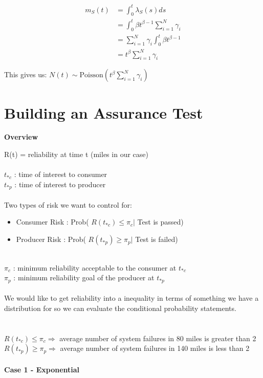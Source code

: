 \documentclass{article}
\begin{document}
$$
\begin{aligned}
	m_S(t) &= \int_0^t \lambda_S(s)ds \\
    &= \int_0^t \beta t^{\beta -1} \sum_{i = 1}^N \gamma_i \\
    &= \sum_{i = 1}^N \gamma_i \int_0^t \beta t^{\beta -1} \\
    &= t^\beta \sum_{i = 1}^N \gamma_i
\end{aligned}
$$

This gives us: $N(t) \sim \text{Poisson}(t^\beta \sum_{i = 1}^N \gamma_i)$


\section{Building an Assurance Test}

\textbf{Overview}

R(t) = reliability at time t (miles in our case)
\\
\\$ t_{*c} $ : time of interest to consumer
\\$ t_{*p} $ : time of interest to producer
\\
\\
Two types of risk we want to control for:
\begin{itemize}
\item Consumer Risk :   Prob( $ R(t_{*c}) \leq \pi_c \vert $ Test is passed)
\item Producer Risk :   Prob( $ R(t_{*p}) \geq \pi_p \vert $ Test is failed)
\end{itemize}
\
\\$ \pi_c $ : minimum reliability acceptable to the consumer at $ t_{*c} $
\\$ \pi_p $ : minimum reliability goal of the producer at $ t_{*p} $
\\
\\
We would like to get reliability into a inequality in terms of something we have a distribution for so we can evaluate the conditional probability statements.
\\
\\
\\$ R(t_{*c}) \leq \pi_c \Rightarrow $ average number of system failures in 80 miles is greater than 2
\\$ R(t_{*p}) \geq \pi_p \Rightarrow $ average number of system failures in 140 miles is less than 2
\\
\\
\textbf{Case 1 - Exponential}
\end{document}
